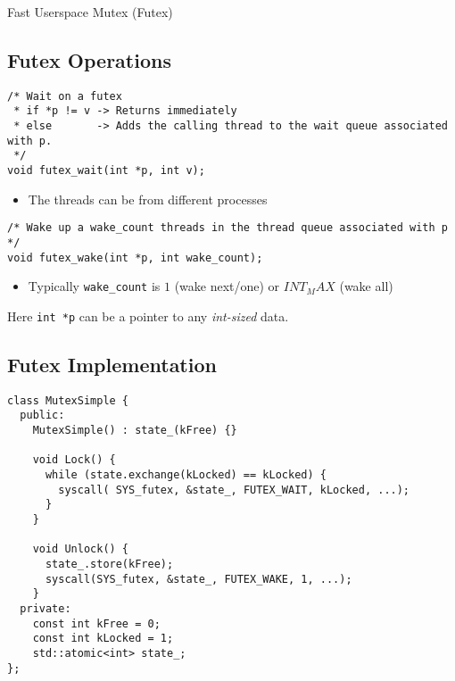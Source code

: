 \begin{definitionbox}{Fast Userspace Mutex (Futex)}
  
\end{definitionbox}

\subsection{Futex Operations}
\begin{verbatim}
/* Wait on a futex
 * if *p != v -> Returns immediately
 * else       -> Adds the calling thread to the wait queue associated with p.
 */
void futex_wait(int *p, int v);
\end{verbatim}
\begin{itemize}
  \item The threads can be from different processes
\end{itemize}


\begin{verbatim}
/* Wake up a wake_count threads in the thread queue associated with p */
void futex_wake(int *p, int wake_count);
\end{verbatim}
\begin{itemize}
  \item Typically \texttt{wake_count} is $1$ (wake next/one) or $INT_MAX$ (wake all)
\end{itemize}

Here \texttt{int *p} can be a pointer to any \textit{int-sized} data.

\subsection{Futex Implementation}
\begin{verbatim}
class MutexSimple {
  public:
    MutexSimple() : state_(kFree) {}

    void Lock() {
      while (state.exchange(kLocked) == kLocked) {
        syscall( SYS_futex, &state_, FUTEX_WAIT, kLocked, ...);
      }
    }

    void Unlock() {
      state_.store(kFree);
      syscall(SYS_futex, &state_, FUTEX_WAKE, 1, ...);
    }
  private:
    const int kFree = 0;
    const int kLocked = 1;
    std::atomic<int> state_;
};
\end{verbatim}